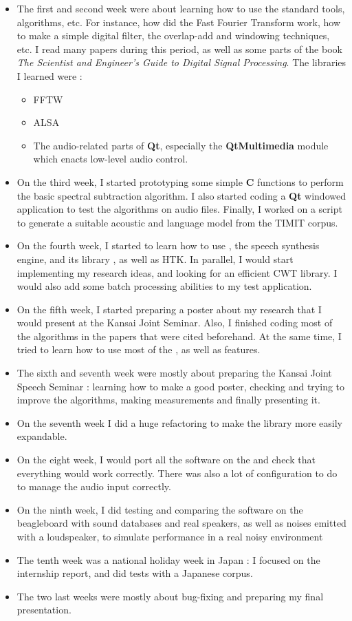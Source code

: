 \begin{itemize}
\item The first and second week were about learning how to use the standard tools, algorithms, etc. For instance, how did the Fast Fourier Transform work, how to make a simple digital filter, the overlap-add and windowing techniques, etc. I read many papers during this period, as well as some parts of the book \textit{The Scientist and Engineer's Guide to Digital Signal Processing}. The libraries I learned were : 
\begin{itemize}
\item \ac{FFTW}
\item \ac{ALSA}
\item The audio-related parts of \textbf{Qt}, especially the \textbf{QtMultimedia} module which enacts low-level audio control.
\end{itemize}
\item On the third week, I started prototyping some simple \textbf{C} functions to perform the basic spectral subtraction algorithm. I also started coding a \textbf{Qt} windowed application to test the algorithms on audio files. Finally, I worked on a script to generate a suitable acoustic and language model from the \ac{TIMIT} corpus.
\item On the fourth week, I started to learn how to use , the speech synthesis engine, and its library , as well as \ac{HTK}. In parallel, I would start implementing my research ideas, and looking for an efficient \ac{CWT} library. I would also add some batch processing abilities to my test application.
\item On the fifth week, I started preparing a poster about my research that I would present at the Kansai Joint Seminar. Also, I finished coding most of the algorithms in the papers that were cited beforehand. At the same time, I tried to learn how to use most of the  , as well as  features.
\item The sixth and seventh week were mostly about preparing the Kansai Joint Speech Seminar : learning how to make a good poster, checking and trying to improve the algorithms, making measurements and finally presenting it.
\item On the seventh week I did a huge refactoring to make the library more easily expandable.
\item On the eight week, I would port all the software on the  and check that everything would work correctly. There was also a lot of configuration to do to manage the audio input correctly.
\item On the ninth week, I did testing and comparing the software on the beagleboard with sound databases and real speakers, as well as noises emitted with a loudspeaker, to simulate performance in a real noisy environment
\item The tenth week was a national holiday week in Japan : I focused on the internship report, and did tests with a Japanese corpus.
\item The two last weeks were mostly about bug-fixing and preparing my final presentation.
\end{itemize}
